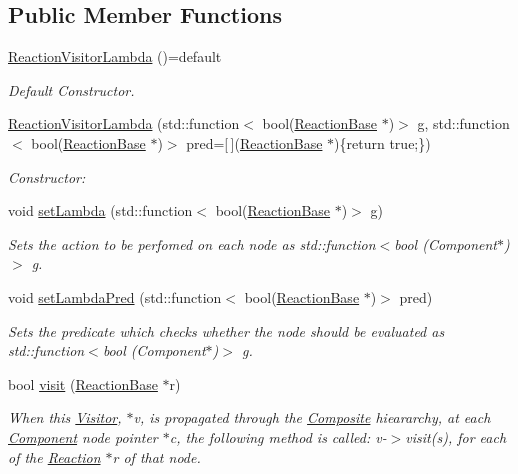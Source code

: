 \subsection*{Public Member Functions}
\begin{DoxyCompactItemize}
\item 
\hyperlink{classReactionVisitorLambda_ad36a99954e16f1ca538459271a0f429f}{Reaction\+Visitor\+Lambda} ()=default
\begin{DoxyCompactList}\small\item\em Default Constructor. \end{DoxyCompactList}\item 
\hyperlink{classReactionVisitorLambda_ad41ac087aa7c2e2daa85604893a28a56}{Reaction\+Visitor\+Lambda} (std\+::function$<$ bool(\hyperlink{classReactionBase}{Reaction\+Base} $\ast$)$>$ g, std\+::function$<$ bool(\hyperlink{classReactionBase}{Reaction\+Base} $\ast$)$>$ pred=\mbox{[}$\,$\mbox{]}(\hyperlink{classReactionBase}{Reaction\+Base} $\ast$)\{return true;\})
\begin{DoxyCompactList}\small\item\em Constructor\+: \end{DoxyCompactList}\item 
void \hyperlink{classReactionVisitorLambda_ade8528f4fbc1d980e043df2787dfe317}{set\+Lambda} (std\+::function$<$ bool(\hyperlink{classReactionBase}{Reaction\+Base} $\ast$)$>$ g)
\begin{DoxyCompactList}\small\item\em Sets the action to be perfomed on each node as std\+::function$<$bool (\+Component$\ast$)$>$ g. \end{DoxyCompactList}\item 
void \hyperlink{classReactionVisitorLambda_acadd3371a2546c5b9a13974db708877a}{set\+Lambda\+Pred} (std\+::function$<$ bool(\hyperlink{classReactionBase}{Reaction\+Base} $\ast$)$>$ pred)
\begin{DoxyCompactList}\small\item\em Sets the predicate which checks whether the node should be evaluated as std\+::function$<$bool (\+Component$\ast$)$>$ g. \end{DoxyCompactList}\item 
bool \hyperlink{classReactionVisitor_a2a2381f0f0fcd0067537af8d965a32d3}{visit} (\hyperlink{classReactionBase}{Reaction\+Base} $\ast$r)
\begin{DoxyCompactList}\small\item\em When this \hyperlink{classVisitor}{Visitor}, $\ast$v, is propagated through the \hyperlink{classComposite}{Composite} hieararchy, at each \hyperlink{classComponent}{Component} node pointer $\ast$c, the following method is called\+: v-\/$>$visit(s), for each of the \hyperlink{classReaction}{Reaction} $\ast$r of that node. \end{DoxyCompactList}\end{DoxyCompactItemize}
